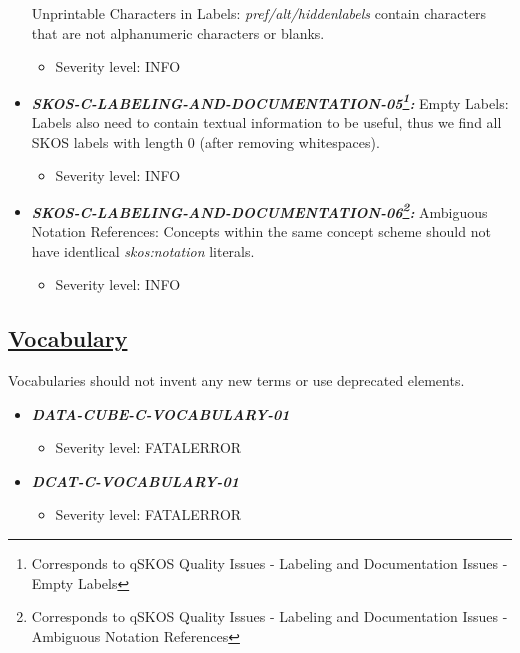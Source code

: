 \documentclass{llncs}
\begin{document}
\begin{itemize}
	Unprintable Characters in Labels:
	\emph{pref/alt/hiddenlabels} contain characters that are not alphanumeric characters or blanks.
	\begin{itemize}
		\item Severity level: INFO
	\end{itemize}
	\item \textbf{{\em SKOS-C-LABELING-AND-DOCUMENTATION-05\footnote{Corresponds to qSKOS Quality Issues - Labeling and Documentation Issues - Empty Labels}:}}
	Empty Labels:
	Labels also need to contain textual information to be useful, thus we find all SKOS labels with length 0 (after removing whitespaces). 
	\begin{itemize}
		\item Severity level: INFO
	\end{itemize}
	\item \textbf{{\em SKOS-C-LABELING-AND-DOCUMENTATION-06\footnote{Corresponds to qSKOS Quality Issues - Labeling and Documentation Issues - Ambiguous Notation References}:}}
	Ambiguous Notation References:
	Concepts within the same concept scheme should not have identlical \emph{skos:notation} literals. 
	\begin{itemize}
		\item Severity level: INFO
	\end{itemize}
\end{itemize}

\subsection{\underline{Vocabulary}}
Vocabularies should not invent any new terms or use deprecated elements. 

\begin{itemize}
	\item \textbf{\em DATA-CUBE-C-VOCABULARY-01} 
	\begin{itemize}
		\item Severity level: FATALERROR
	\end{itemize}
\end{itemize}

\begin{itemize}
	\item \textbf{\em DCAT-C-VOCABULARY-01} 
	\begin{itemize}
		\item Severity level: FATALERROR
	\end{itemize}
\end{itemize}
\end{document}
